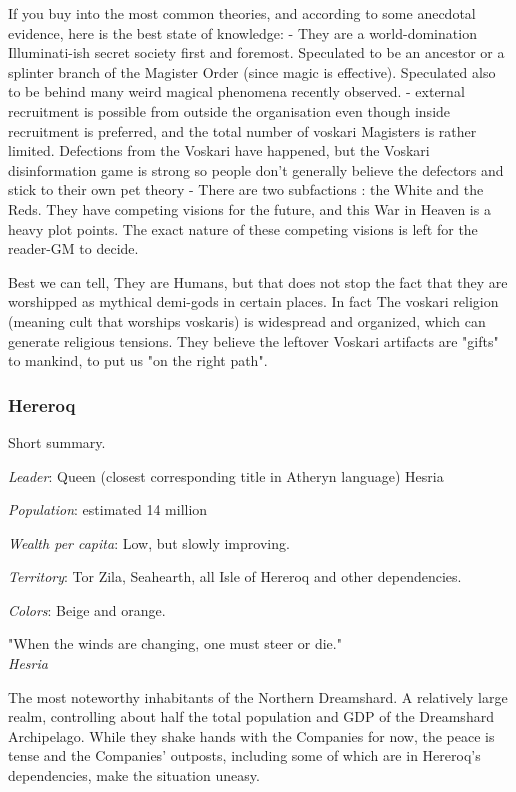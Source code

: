 If you buy into the most common theories, and according to some anecdotal evidence, here is the best state of knowledge: 
    - They are a world-domination Illuminati-ish secret society first and foremost. Speculated to be an ancestor or a splinter branch of the Magister Order (since magic is effective). Speculated also to be behind many weird magical phenomena recently observed.
    - external recruitment is possible from outside the organisation even though inside recruitment is preferred, and the total number of voskari Magisters is rather limited. Defections from the Voskari have happened, but the Voskari disinformation game is strong so people don't generally believe the defectors and stick to their own pet theory
    - There are two subfactions : the White and the Reds. They have competing visions for the future, and this War in Heaven is a heavy plot points. The exact nature of these competing visions is left for the reader-GM to decide.

Best we can tell, They are Humans, but that does not stop the fact that they are worshipped as mythical demi-gods in certain places. In fact The voskari religion (meaning cult that worships voskaris) is widespread and organized, which can generate religious tensions. They believe the leftover Voskari artifacts are "gifts" to mankind, to put us "on the right path". 


\subsubsection{Hereroq}


Short summary.


\textit{Leader}: Queen (closest corresponding title in Atheryn language) Hesria

\textit{Population}: estimated 14 million

\textit{Wealth per capita}: Low, but slowly improving.

\textit{Territory}: Tor Zila, Seahearth, all Isle of Hereroq and other dependencies.
    
\textit{Colors}: Beige and orange.


\begin{rpg-quotebox}
    "When the winds are changing, one must steer or die." \\ \textendash \textit{Hesria}
\end{rpg-quotebox}


The most noteworthy inhabitants of the Northern Dreamshard. A relatively large realm, controlling about half the total population and GDP of the Dreamshard Archipelago. While they shake hands with the Companies for now, the peace is tense and the Companies' outposts, including some of which are in Hereroq's dependencies, make the situation uneasy.


